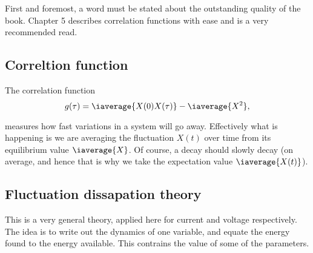  First and foremost, a word must be stated about the outstanding quality of the book. Chapter 5 describes correlation functions with ease and is a very recommended read.
 \subsection{Correltion function}
  The correlation function 
  \begin{equation}\label{eqn:corr1}
  	g(\tau) = \iaverage{X(0)X(\tau)} - \iaverage{X^2},
  \end{equation}
  
  \noindent measures how fast variations in a system will go away. Effectively what is happening is we are averaging the fluctuation $ X(t) $ over time from its equilibrium value $ \iaverage{X} $. Of course, a decay should slowly decay (on average, and hence that is why we take the expectation value $ \iaverage{X(t)} $). 
  
  
  
 \subsection{Fluctuation dissapation theory}\label{subsec:fluctuationDissapation}
  This is a very general theory, applied here for current and voltage respectively. The idea is to write out the dynamics of one variable, and equate the energy found to the energy available. This contrains the value of some of the parameters.
  

